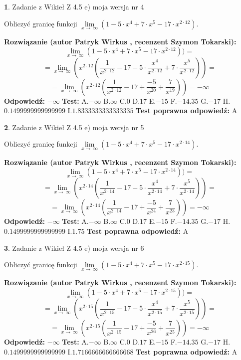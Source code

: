 \documentclass[12pt, a4paper]{article}
\theoremstyle{definition} %
\newtheorem{zad}{}
\newcommand{\zadStart}[1]{\begin{zad}#1\newline}
\newcommand{\zadStop}{\end{zad}}
\newcommand{\rozwStart}[2]{\noindent \textbf{Rozwiązanie (autor #1 , recenzent #2): }\newline}
\newcommand{\rozwStop}{\newline}
\newcommand{\odpStart}{\noindent \textbf{Odpowiedź:}\newline}
\newcommand{\odpStop}{\newline}
\newcommand{\testStart}{\noindent \textbf{Test:}\newline}
\newcommand{\testStop}{\newline}
\newcommand{\kluczStart}{\noindent \textbf{Test poprawna odpowiedź:}\newline}
\newcommand{\kluczStop}{\newline}
\begin{document}
\zadStart{Zadanie z Wikieł Z 4.5 e) moja wersja nr 4}


Obliczyć granicę funkcji  $\lim\limits_{x\to\ \infty}(1 - 5 \cdot x^{4}+7 \cdot x^{5}- 17 \cdot x^{2\cdot12})$.
\zadStop
\rozwStart{Patryk Wirkus}{Szymon Tokarski}
$$\lim\limits_{x\to\ \infty}(1 - 5 \cdot x^{4}+7 \cdot x^{5}- 17 \cdot x^{2\cdot12}))=$$
$$=\lim\limits_{x\to\ \infty}(x^{2\cdot12}(\frac{1}{x^{2\cdot12}}-17 -5 \cdot \frac{x^{4}}{x^{2\cdot12}}+7 \cdot \frac{x^{5}}{x^{2\cdot12}}))=$$
$$=\lim\limits_{x\to\ \infty}(x^{2\cdot12}(\frac{1}{x^{2\cdot12}}-17 + \frac{-5}{x^{20}}+ \frac{7}{x^{19}}))=-\infty$$
\rozwStop
\odpStart
$-\infty$
\odpStop
\testStart
A.$-\infty$ B.$\infty$ C.$0$ D.$17$ E.$-15$
F.$-14.35$ G.$-17$
H.$0.1499999999999999$
I.$1.8333333333333335$
\testStop
\kluczStart
A
\kluczStop



\zadStart{Zadanie z Wikieł Z 4.5 e) moja wersja nr 5}


Obliczyć granicę funkcji  $\lim\limits_{x\to\ \infty}(1 - 5 \cdot x^{4}+7 \cdot x^{5}- 17 \cdot x^{2\cdot14})$.
\zadStop
\rozwStart{Patryk Wirkus}{Szymon Tokarski}
$$\lim\limits_{x\to\ \infty}(1 - 5 \cdot x^{4}+7 \cdot x^{5}- 17 \cdot x^{2\cdot14}))=$$
$$=\lim\limits_{x\to\ \infty}(x^{2\cdot14}(\frac{1}{x^{2\cdot14}}-17 -5 \cdot \frac{x^{4}}{x^{2\cdot14}}+7 \cdot \frac{x^{5}}{x^{2\cdot14}}))=$$
$$=\lim\limits_{x\to\ \infty}(x^{2\cdot14}(\frac{1}{x^{2\cdot14}}-17 + \frac{-5}{x^{24}}+ \frac{7}{x^{23}}))=-\infty$$
\rozwStop
\odpStart
$-\infty$
\odpStop
\testStart
A.$-\infty$ B.$\infty$ C.$0$ D.$17$ E.$-15$
F.$-14.35$ G.$-17$
H.$0.1499999999999999$
I.$1.75$
\testStop
\kluczStart
A
\kluczStop



\zadStart{Zadanie z Wikieł Z 4.5 e) moja wersja nr 6}


Obliczyć granicę funkcji  $\lim\limits_{x\to\ \infty}(1 - 5 \cdot x^{4}+7 \cdot x^{5}- 17 \cdot x^{2\cdot15})$.
\zadStop
\rozwStart{Patryk Wirkus}{Szymon Tokarski}
$$\lim\limits_{x\to\ \infty}(1 - 5 \cdot x^{4}+7 \cdot x^{5}- 17 \cdot x^{2\cdot15}))=$$
$$=\lim\limits_{x\to\ \infty}(x^{2\cdot15}(\frac{1}{x^{2\cdot15}}-17 -5 \cdot \frac{x^{4}}{x^{2\cdot15}}+7 \cdot \frac{x^{5}}{x^{2\cdot15}}))=$$
$$=\lim\limits_{x\to\ \infty}(x^{2\cdot15}(\frac{1}{x^{2\cdot15}}-17 + \frac{-5}{x^{26}}+ \frac{7}{x^{25}}))=-\infty$$
\rozwStop
\odpStart
$-\infty$
\odpStop
\testStart
A.$-\infty$ B.$\infty$ C.$0$ D.$17$ E.$-15$
F.$-14.35$ G.$-17$
H.$0.1499999999999999$
I.$1.7166666666666668$
\testStop
\kluczStart
A
\kluczStop
\end{document}
